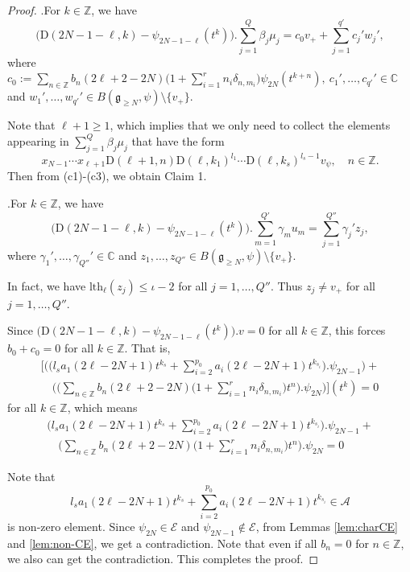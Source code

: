 \documentclass[12pt, a4paper]{amsart}
\newcommand{\fg}{\mathfrak g}
\newcommand{\C}{\mathbb{C}}
\newcommand{\Z}{\mathbb Z}
\newcommand{\rD}{\mathrm{D}}
\theoremstyle{Theorem}
\theoremstyle{Theorem}
\numberwithin{equation}{section}
\begin{document}
\begin{proof}
\vspace{2mm}

.\quad For $k\in\Z$, we have
$$\big(\rD(2N-1-\ell,k)-\psi_{2N-1-\ell}(t^{k})\big).\sum_{j=1}^{Q}\beta_{j}\mu_{j}=c_{0}v_{+}+\sum_{j=1}^{q'}c_{j}'w_{j}',$$
where $c_{0}:=\sum_{n\in\Z}b_{n}(2\ell+2-2N)\big(1+\sum_{i=1}^{r}n_{i}\delta_{n,m_{i}}\big)\psi_{2N}(t^{k+n}),\ c_{1}',\dots,
c_{q'}'\in\C$
and $w_{1}',\dots,w_{q'}'\in B(\fg_{\geq N},\psi)\setminus\{v_{+}\}$.

Note that $\ell+1\geq1$, which implies that we only need to collect the elements
appearing in $\sum_{j=1}^{Q}\beta_{j}\mu_{j}$ that have the form
\[x_{N-1}\cdots x_{\ell+1}\rD(\ell+1,n)\rD(\ell,k_{1})^{l_{1}}\cdots\rD(\ell,k_{s})^{l_{s}-1}v_{\psi},\quad n\in\Z.\]
Then from (c1)-(c3), we obtain Claim 1.




.\quad For $k\in\Z$, we have
$$\big(\rD(2N-1-\ell,k)-\psi_{2N-1-\ell}(t^{k})\big).\sum_{m=1}^{Q'}\gamma_{m}u_{m}=\sum_{j=1}^{Q''}\gamma_{j}'z_{j},$$
where $\gamma_{1}',\dots,\gamma_{Q''}'\in\C$ and $z_{1},\dots,z_{Q''}\in B(\fg_{\geq N},\psi)\setminus\{v_{+}\}$.

In fact, we have $\mathrm{lth}_{\ell}(z_{j})\leq\iota-2$ for all $j=1,\dots,Q''$.
Thus $z_{j}\neq v_{+}$ for all $j=1,\dots,Q''$.

\vspace{3mm}

Since $\big(\rD(2N-1-\ell,k)-\psi_{2N-1-\ell}(t^{k})\big).v=0$ for all $k\in\Z$, this forces
$b_{0}+c_{0}=0$ for all $k\in\Z$.
That is,
$$\begin{aligned}
\Big[\Big(\big(l_{s}a_{1}(2\ell-2N+1)t^{k_{s}}+\sum_{i=2}^{p_{0}}a_{i}(2\ell-2N+1)t^{k_{s_{i}}}\big).\psi_{2N-1}\Big)
+\\ \quad \Big(\big(\sum_{n\in\Z}b_{n}(2\ell+2-2N)\big(1+\sum_{i=1}^{r}n_{i}\delta_{n,m_{i}}\big)t^{n}\big).\psi_{2N}\Big)\Big](t^{k})=0
\end{aligned}$$
for all $k\in\Z$, which means
$$\begin{aligned}
\Big(l_{s}a_{1}(2\ell-2N+1)t^{k_{s}}+\sum_{i=2}^{p_{0}}a_{i}(2\ell-2N+1)t^{k_{s_{i}}}\Big).\psi_{2N-1}
+\\ \quad \Big(\sum_{n\in\Z}b_{n}(2\ell+2-2N)\big(1+\sum_{i=1}^{r}n_{i}\delta_{n,m_{i}}\big)t^{n}\Big).\psi_{2N}=0
\end{aligned}$$

Note that \[l_{s}a_{1}(2\ell-2N+1)t^{k_{s}}+\sum_{i=2}^{p_{0}}a_{i}(2\ell-2N+1)t^{k_{s_{i}}}\in\mathcal{A}\]
is non-zero element. Since $\psi_{2N}\in\mathcal{E}$ and $\psi_{2N-1}\notin\mathcal{E}$,
from Lemmas \ref{lem:charCE} and \ref{lem:non-CE}, we get a contradiction.
Note that even if all $b_{n}=0$ for $n\in\Z$, we also can get the contradiction. This completes the proof.
\end{proof}
\end{document}
